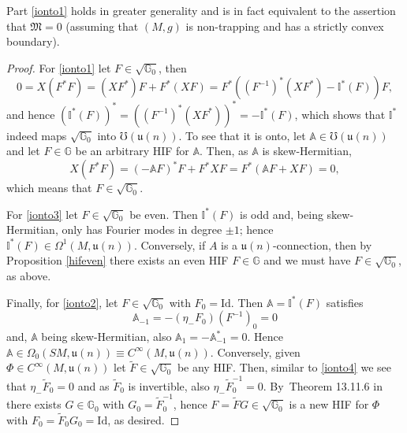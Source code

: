 \documentclass[JEP,XML,SOM,Unicode,published]{cedram}
\theoremstyle{plain}
\theoremstyle{definition}
\newcommand{\A}{\mathbb{A}}
\newcommand{\G}{\mathbb{G}}
\newcommand{\I}{\mathbb{I}}
\newcommand{\M}{\mathfrak{M}}
\renewcommand{\u}{\mathfrak{u}}
\newcommand{\Id}{\mathrm{Id}}
\newcommand{\1}{{\bf 1}}
\begin{document}
Part \eqref{ionto1} holds in greater generality and is in fact equivalent to the assertion that $\M=0$ (assuming that $(M,g)$ is non-trapping and has a strictly convex boundary).

\begin{proof}
For \eqref{ionto1} let $F\in \sqrt{\G_0}$, then
\begin{equation*}
0 = X(F^*F)=(X F^*) F + F^* (XF) = F^*\left((F^{-1})^* (XF^*) - \I^* (F) \right) F,
\end{equation*}
and hence
$
\left( \I^* (F)\right)^* = \left( (F^{-1})^* (XF^*) \right)^* = -\I^*(F)
$, which shows that $\I^*$ indeed maps $\sqrt{\G_0}$ into $\mho(\u(n))$. To see that it is onto, let $\A\in \mho(\u(n))$ and let $F\in \G$ be an arbitrary HIF for $\A$. Then, as $\A$ is skew-Hermitian,
\begin{equation*}
X (F^*F) = (-\A F)^* F + F^* XF= F^* (\A F+XF)=0,
\end{equation*}
which means that $F\in \sqrt{\G_0}$.

For \eqref{ionto3} let $F\in \sqrt{\G_0}$ be even. Then $\I^*(F)$ is odd and, being skew-Hermitian, only has Fourier modes in degree $\pm 1$; hence $\I^*(F)\in \Omega^1(M,\u(n))$. Conversely, if $A$ is a $\u(n)$-connection, then by Proposition \ref{hifeven} there exists an even HIF $F\in \G$ and we must have $F\in \sqrt{\G_0}$, as above.

Finally, for \eqref{ionto2}, let $F\in \sqrt{\G_0}$ with $F_0=\Id$. Then $\A = \I^*(F)$ satisfies
\begin{equation}\label{ionto4}
\A_{-1} = - (\eta_-F_0) (F^{-1})_0 = 0
\end{equation}
and, $\A$ being skew-Hermitian, also $\A_1 = - \A_{-1}^*=0$. Hence $\A\in \Omega_0(SM,\u(n))\equiv C^\infty(M,\u(n))$. Conversely, given $\Phi \in C^\infty(M,\u(n))$ let $\tilde F\in \sqrt{\G_0}$ be any HIF. Then, similar to \eqref{ionto4} we see that $\eta_- \tilde F_0 = 0$ and as $\tilde F_0$ is invertible, also $\eta_- \tilde F_0^{-1} = 0$. By~Theorem 13.11.6 in \cite{PSU20} there exists $G\in \G_0$ with $G_0=\tilde F_0^{-1}$, hence $F=\tilde F G \in \sqrt{\G_0}$ is a new HIF for $\Phi$ with $F_0 = \tilde F_0 G_0 = \Id$, as desired.
\end{proof}
\end{document}
